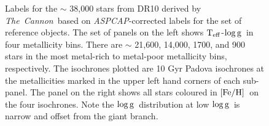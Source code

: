 \documentclass[12pt, preprint]{aastex}
\newcommand{\tc}{\textsl{The~Cannon}}
\newcommand{\aspcap}{\textsl{ASPCAP}}
\newcommand{\teff}{\mbox{$\rm T_{eff}$}}
\newcommand{\feh}{\mbox{$\rm [Fe/H]$}}
\newcommand{\logg}{\mbox{$\rm \log g$}}
\begin{document}
\begin{figure}[!h]
\caption{Labels for the $\sim$ 38,000 stars from DR10 derived by \tc\ based on \aspcap-corrected labels for the set of reference objects. The set of panels on the left shows \teff-\logg\ in four metallicity bins. There are $\sim$ 21,600, 14,000, 1700, and 900 stars in the most metal-rich to metal-poor metallicity bins, respectively. The isochrones plotted are 10 Gyr Padova isochrones at the metallicities marked in the upper left hand corners of each sub-panel.  The panel on the right shows all stars coloured in \feh\ on the four isochrones. Note the \logg\ distribution at low \logg\ is narrow and offset from the giant branch. }
\label{fig:iso}
\end{figure}


\begin{figure}[!h]
\centering


\end{figure}
\end{document}
